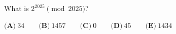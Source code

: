 What is $2^{2025}\pmod{2025}$?

$\textbf{(A)}~34\qquad\textbf{(B)}~1457\qquad\textbf{(C)}~0\qquad\textbf{(D)}~45\qquad\textbf{(E)}~1434\qquad$
